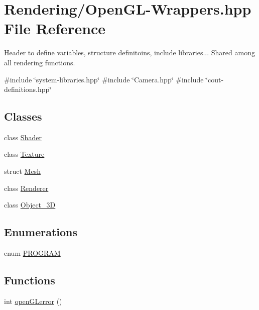 \hypertarget{OpenGL-Wrappers_8hpp}{}\section{Rendering/\+Open\+G\+L-\/\+Wrappers.hpp File Reference}
\label{OpenGL-Wrappers_8hpp}


Header to define variables, structure definitoins, include libraries... Shared among all rendering functions.  


{\ttfamily \#include \char`\"{}system-\/libraries.\+hpp\char`\"{}}\newline
{\ttfamily \#include \char`\"{}Camera.\+hpp\char`\"{}}\newline
{\ttfamily \#include \char`\"{}cout-\/definitions.\+hpp\char`\"{}}\newline
\subsection*{Classes}
\begin{DoxyCompactItemize}
\item 
class \mbox{\hyperlink{classShader}{Shader}}
\item 
class \mbox{\hyperlink{classTexture}{Texture}}
\item 
struct \mbox{\hyperlink{structMesh}{Mesh}}
\item 
class \mbox{\hyperlink{classRenderer}{Renderer}}
\item 
class \mbox{\hyperlink{classObject__3D}{Object\+\_\+3D}}
\end{DoxyCompactItemize}
\subsection*{Enumerations}
\begin{DoxyCompactItemize}
\item 
enum \mbox{\hyperlink{OpenGL-Wrappers_8hpp_a567e6cb5b1eb395b3bce74667420d5ea}{P\+R\+O\+G\+R\+AM}} 
\end{DoxyCompactItemize}
\subsection*{Functions}
\begin{DoxyCompactItemize}
\item 
int \mbox{\hyperlink{OpenGL-Wrappers_8hpp_a2008ec7e2e49a51a3d3f0091cf96bc55}{open\+G\+Lerror}} ()
\end{DoxyCompactItemize}
